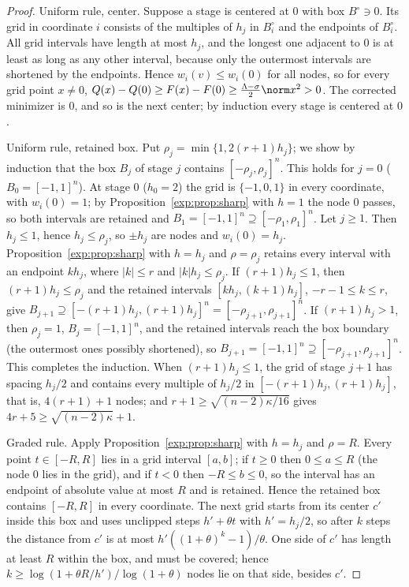 \begin{proof}
Uniform rule, center. Suppose a stage is centered at $0$ with box
$B^\circ\ni0$. Its grid in coordinate $i$ consists of the multiples of $h_j$
in $B^\circ_i$ and the endpoints of $B^\circ_i$. All grid intervals have length
at most $h_j$, and the longest one adjacent to $0$ is at least as long as any
other interval, because only the outermost intervals are shortened by the
endpoints. Hence $w_i(v)\le w_i(0)$ for all nodes, so for every grid point
$x\ne0$,
$Q(x)-Q(0)\ge F(x)-F(0)\ge\frac{\Lambda-\sigma}2\norm x^2>0$. The corrected
minimizer is $0$, and so is the next center; by induction every stage is
centered at $0$.

Uniform rule, retained box. Put $\rho_j=\min\{1,2(r+1)h_j\}$; we show by
induction that the box $B_j$ of stage $j$ contains $[-\rho_j,\rho_j]^n$.
This holds for $j=0$ ($B_0=[-1,1]^n$). At stage $0$ ($h_0=2$) the grid is
$\{-1,0,1\}$ in every coordinate, with $w_i(0)=1$; by
Proposition~\ref{exp:prop:sharp} with $h=1$ the node $0$ passes, so both
intervals are retained and $B_1=[-1,1]^n\supseteq[-\rho_1,\rho_1]^n$. Let
$j\ge1$. Then $h_j\le1$, hence $h_j\le\rho_j$, so $\pm h_j$ are nodes and
$w_i(0)=h_j$. Proposition~\ref{exp:prop:sharp} with $h=h_j$ and
$\rho=\rho_j$ retains every interval with an endpoint $kh_j$, where
$|k|\le r$ and $|k|h_j\le\rho_j$. If $(r+1)h_j\le1$, then $(r+1)h_j\le\rho_j$
and the retained intervals $[kh_j,(k+1)h_j]$, $-r-1\le k\le r$, give
$B_{j+1}\supseteq[-(r+1)h_j,(r+1)h_j]^n=[-\rho_{j+1},\rho_{j+1}]^n$. If
$(r+1)h_j>1$, then $\rho_j=1$, $B_j=[-1,1]^n$, and the retained intervals
reach the box boundary (the outermost ones possibly shortened), so
$B_{j+1}=[-1,1]^n\supseteq[-\rho_{j+1},\rho_{j+1}]^n$. This completes the
induction. When $(r+1)h_j\le1$, the grid of stage $j+1$ has spacing $h_j/2$
and contains every multiple of $h_j/2$ in $[-(r+1)h_j,(r+1)h_j]$, that is,
$4(r+1)+1$ nodes; and $r+1\ge\sqrt{(n-2)\kappa/16}$ gives
$4r+5\ge\sqrt{(n-2)\kappa}+1$.

Graded rule. Apply Proposition~\ref{exp:prop:sharp} with $h=h_j$ and
$\rho=R$. Every point $t\in[-R,R]$ lies in a grid interval $[a,b]$; if
$t\ge0$ then $0\le a\le R$ (the node $0$ lies in the grid), and if $t<0$ then
$-R\le b\le0$, so the interval has an endpoint of absolute value at most
$R$ and is retained. Hence the retained box contains $[-R,R]$ in every
coordinate. The next grid starts from its center $c'$ inside this box and
uses unclipped steps $h'+\theta t$ with $h'=h_j/2$, so after $k$ steps the
distance from $c'$ is at most $h'((1+\theta)^k-1)/\theta$. One side of $c'$
has length at least $R$ within the box, and must be covered; hence
$k\ge\log(1+\theta R/h')/\log(1+\theta)$ nodes lie on that side, besides
$c'$.
\end{proof}

